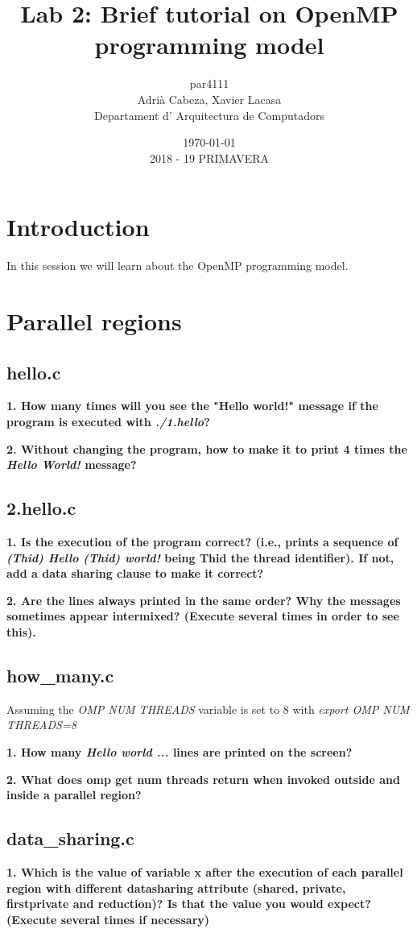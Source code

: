 \documentclass[12]{article}
\author{par4111 \\ Adrià Cabeza, Xavier Lacasa \\ Departament d' Arquitectura de Computadors}
\title{Lab 2: Brief tutorial on OpenMP programming model }
\date{\today \\ 2018 - 19 PRIMAVERA}
\begin{document}
\maketitle

\newpage
\tableofcontents
\newpage
\section{Introduction}

In this session we will learn about the OpenMP programming model. 

\section{Parallel regions}
\subsection{hello.c}
\textbf{1. How many times will you see the "Hello world!" message if the program is executed with \textit{./1.hello}?}

\textbf{2. Without changing the program, how to make it to print 4 times the \textit{Hello World!} message?}


\subsection{2.hello.c}
\textbf{1. Is the execution of the program correct? (i.e., prints a sequence of \textit{(Thid) Hello (Thid)
world!} being Thid the thread identifier). If not, add a data sharing clause to make it correct?} 

\textbf{2. Are the lines always printed in the same order? Why the messages sometimes appear intermixed?
(Execute several times in order to see this).}

\subsection{how\_many.c}
Assuming the \textit{OMP NUM THREADS} variable is set to 8 with \textit{export OMP NUM THREADS=8}


\textbf{1. How many \textit{Hello world ...} lines are printed on the screen?}

\textbf{2. What does omp get num threads return when invoked outside and inside a parallel region?}

\subsection{data\_sharing.c}
\textbf{1. Which is the value of variable x after the execution of each parallel region with different datasharing
attribute (shared, private, firstprivate and reduction)? Is that the value you would expect? (Execute several times if necessary)}
\end{document}

